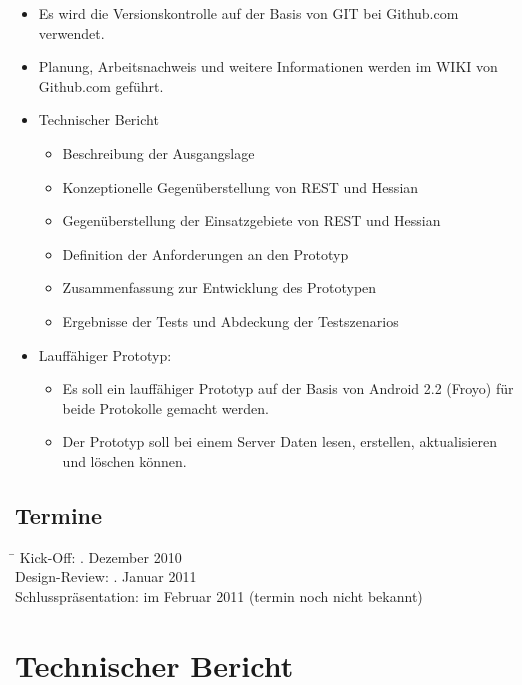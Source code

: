 \documentclass[listof=totocnumbered, bibliography=totocnumbered]{scrreprt}
\begin{document}
  \begin{itemize}
    \item Es wird die Versionskontrolle auf der Basis von GIT bei
          Github.com verwendet.
    \item Planung, Arbeitsnachweis und weitere Informationen werden im WIKI
          von Github.com geführt.
    \item Technischer Bericht
    \begin{itemize}
      \item Beschreibung der Ausgangslage
      \item Konzeptionelle Gegenüberstellung von \ac{REST} und Hessian
      \item Gegenüberstellung der Einsatzgebiete von \ac{REST} und Hessian
      \item Definition der Anforderungen an den Prototyp 
      \item Zusammenfassung zur Entwicklung des Prototypen
      \item Ergebnisse der Tests und Abdeckung der Testszenarios
    \end{itemize}
    \item Lauffähiger Prototyp:
    \begin{itemize}
      \item Es soll ein lauffähiger Prototyp auf der Basis von
            Android 2.2 (Froyo) für beide Protokolle gemacht werden.
      \item Der Prototyp soll bei einem Server Daten lesen, erstellen,
            aktualisieren und löschen können.
    \end{itemize}
  \end{itemize}
  
  \section{Termine}
  
  \begin{tabbing}
    \hspace*{4cm}\= \kill
    Kick-Off:               . Dezember 2010 \\
    Design-Review:          . Januar 2011 \\
    Schlusspräsentation:    \> im Februar 2011 (termin noch nicht bekannt)\\
  \end{tabbing}
  
  \chapter{Technischer Bericht}
  
\end{document}
